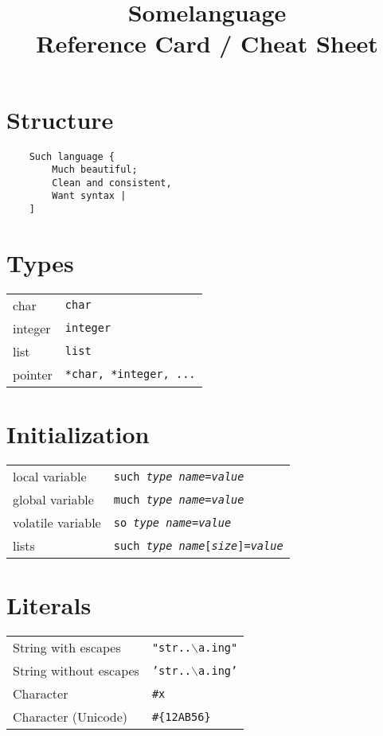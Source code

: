 \documentclass{refcard}
\title{Somelanguage\\Reference Card / Cheat Sheet}
\begin{document}
\maketitle

\section{Structure}

\begin{verbatim}
	Such language {
	    Much beautiful;
	    Clean and consistent,
	    Want syntax |
	]
\end{verbatim}

\section{Types}

\begin{tabular}{ll}
	char    & \texttt{char} \\
	integer & \texttt{integer} \\
	list    & \texttt{list} \\
	pointer & \texttt{*char, *integer, ...} \\
\end{tabular}

\section{Initialization}

\begin{tabular}{ll}
	local variable    & \texttt{such \textit{type} \textit{name}=\textit{value}} \\
	global variable   & \texttt{much \textit{type} \textit{name}=\textit{value}} \\
	volatile variable & \texttt{so   \textit{type} \textit{name}=\textit{value}} \\
	lists             & \texttt{such \textit{type} \textit{name}[\textit{size}]=\textit{value}} \\
\end{tabular}

\section{Literals}

\begin{tabular}{ll}
	String with escapes    & \texttt{"str..$\backslash{}$a.ing"} \\
	String without escapes & \texttt{'str..$\backslash{}$a.ing'} \\
	Character              & \texttt{\#x} \\
	Character (Unicode)    & \texttt{\#\{12AB56\}} \\
\end{tabular}
\end{document}
